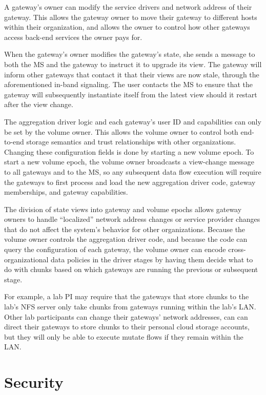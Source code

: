 A gateway's owner can modify the service drivers and network address of their
gateway.  This allows the gateway owner to move their gateway to different hosts
within their organization, and allows the owner to control how other gateways
access back-end services the owner pays for.

When the gateway's owner modifies the gateway's state, she sends a message to
both the MS and the gateway to instruct it to upgrade its view.
The gateway will inform other gateways that contact it that their views are now
stale, through the aforementioned in-band signaling.
The user contacts the MS to ensure that the gateway will subsequently
instantiate itself from the latest view should it restart after the view change.

The aggregation driver logic and each gateway's user ID and capabilities
can only be set by the volume owner.  This allows the volume owner to control
both end-to-end storage semantics and trust relationships with other organizations.
Changing these configuration fields is done by starting a new volume epoch.
To start a new volume epoch, the volume owner broadcasts a view-change message to
all gateways and to the MS, so any subsequent data flow execution will require
the gateways to first process and load the new aggregation driver code, gateway
memberships, and gateway capabilities.

The division of state views into gateway and volume epochs
allows gateway owners to handle ``localized''
network address changes or service provider changes that do not affect the
system's behavior for other organizations.  Because the volume owner controls
the aggregation driver code, and because the code can query the 
configuration of each gateway, the volume owner can encode cross-organizational
data policies in the driver stages by having them decide what to do with
chunks based on which gateways are running the previous or subsequent stage.

For example, a lab PI may require that the gateways that store chunks
to the lab's NFS server only take chunks from gateways running within the lab's
LAN.  Other lab participants can change their gateways' network addresses, can
can direct their gateways to store chunks to their personal cloud storage
accounts, but they will only be able to execute mutate flows if they remain
within the LAN.

\section{Security}
\label{sec:security}

